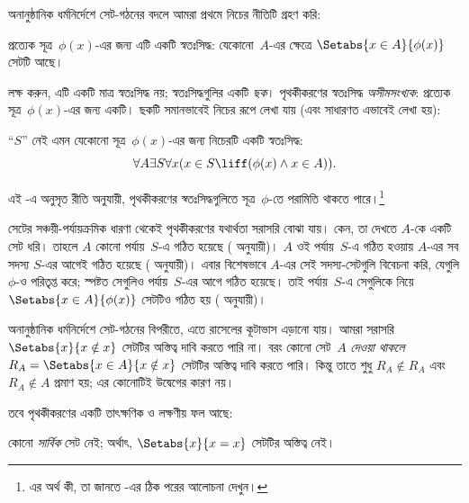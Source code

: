 \documentclass[../../../include/open-logic-section]{subfiles}
\begin{document}

অনানুষ্ঠানিক ধর্মনির্দেশে সেট-গঠনের বদলে আমরা প্রথমে
নিচের নীতিটি গ্রহণ করি:

\begin{axiom}[পৃথকীকরণ ছক] প্রত্যেক সূত্র~$\phi(x)$-এর জন্য
এটি একটি স্বতঃসিদ্ধ: যেকোনো~$A$-এর ক্ষেত্রে
$\Setabs{x \in A}{\phi(x)}$ সেটটি আছে।
\end{axiom}

লক্ষ করুন, এটি একটি মাত্র স্বতঃসিদ্ধ নয়;
স্বতঃসিদ্ধগুলির একটি \emph{ছক}। পৃথকীকরণের স্বতঃসিদ্ধ
\emph{অসীমসংখ্যক}: প্রত্যেক সূত্র~$\phi(x)$-এর জন্য
একটি। ছকটি সমানভাবেই নিচের রূপে লেখা যায় (এবং সাধারণত
এভাবেই লেখা হয়):

\begin{defish}
``$S$'' নেই এমন যেকোনো সূত্র~$\phi(x)$-এর জন্য
নিচেরটি একটি স্বতঃসিদ্ধ:
\[
  \forall A \exists S \forall x(x \in S \liff (\phi(x) \land x \in A)).
\]
\end{defish}

এই -এ অনুসৃত রীতি অনুযায়ী,
পৃথকীকরণের স্বতঃসিদ্ধগুলিতে
সূত্র~$\phi$-তে পরামিতি থাকতে পারে।\footnote{এর অর্থ কী,
তা জানতে -এর
ঠিক পরের আলোচনা দেখুন।}

সেটের সঞ্চয়ী-পর্যায়ক্রমিক ধারণা থেকেই পৃথকীকরণের
যথার্থতা সরাসরি বোঝা যায়। কেন, তা দেখতে $A$-কে
একটি সেট ধরি। তাহলে $A$ কোনো পর্যায়~$S$-এ গঠিত
হয়েছে (\stageshier{} অনুযায়ী)। $A$ ওই পর্যায়~$S$-এ
গঠিত হওয়ায় $A$-এর সব সদস্য $S$-এর আগেই গঠিত হয়েছে
(\stagesacc{} অনুযায়ী)। এবার বিশেষভাবে $A$-এর সেই
সদস্য-সেটগুলি বিবেচনা করি, যেগুলি $\phi$-ও পরিতৃপ্ত করে;
স্পষ্টত সেগুলিও পর্যায়~$S$-এর আগে গঠিত হয়েছে। তাই
পর্যায়~$S$-এ সেগুলিকে নিয়ে
$\Setabs{x \in A}{\phi(x)}$ সেটটিও গঠিত হয়
(\stagesacc{} অনুযায়ী)।

অনানুষ্ঠানিক ধর্মনির্দেশে সেট-গঠনের বিপরীতে, এতে
রাসেলের কূটাভাস এড়ানো যায়। আমরা সরাসরি
$\Setabs{x}{x \notin x}$ সেটটির অস্তিত্ব দাবি করতে
পারি না। বরং কোনো সেট~$A$ \emph{দেওয়া থাকলে}
$R_A = \Setabs{x \in A}{x \notin x}$ সেটটির অস্তিত্ব
দাবি করতে পারি। কিন্তু তাতে শুধু $R_A \notin R_A$
এবং $R_A \notin A$ প্রমাণ হয়; এর কোনোটিই উদ্বেগের
কারণ নয়।

তবে পৃথকীকরণের একটি তাৎক্ষণিক ও লক্ষণীয় ফল আছে:

\begin{thm}
কোনো \emph{সার্বিক} সেট নেই; অর্থাৎ,
$\Setabs{x}{x = x}$ সেটটির অস্তিত্ব নেই।
\end{thm}
\end{document}
